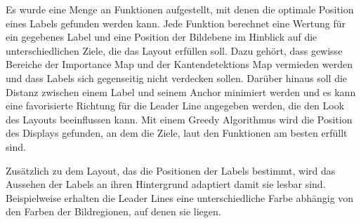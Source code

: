 Es wurde eine Menge an Funktionen aufgestellt, mit denen die optimale Position eines Labels gefunden werden kann. Jede Funktion berechnet eine Wertung für ein gegebenes Label und eine Position der Bildebene im Hinblick auf die unterschiedlichen Ziele, die das Layout erfüllen soll. Dazu gehört, dass gewisse Bereiche der Importance Map und der Kantendetektions Map vermieden werden und dass Labels sich gegenseitig nicht verdecken sollen. Darüber hinaus soll die Distanz zwischen einem Label und seinem Anchor minimiert werden und es kann eine favorisierte Richtung für die Leader Line angegeben werden, die den Look des Layouts beeinflussen kann. Mit einem Greedy Algorithmus wird die Position des Displays gefunden, an dem die Ziele, laut den Funktionen am besten erfüllt sind.


Zusätzlich zu dem Layout, das die Positionen der Labels bestimmt, wird das Aussehen der Labels an ihren Hintergrund adaptiert damit sie lesbar sind. Beispielweise erhalten die Leader Lines eine unterschiedliche Farbe abhängig von den Farben der Bildregionen, auf denen sie liegen.\cite{viewManagementGrasset} %


%
%
%
%
%
%
%
%
%
%


